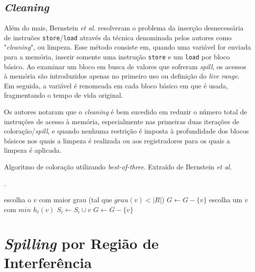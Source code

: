 \documentclass[
	12pt,				%
	openright,			%
	oneside,			%
	a4paper,			%
	tccpreliminar,			%
	]{ABNT-DC-UEL}
\begin{document}
\subsection{\textit{Cleaning}}

Além do mais, Bernstein \textit{et al.} resolveram o problema da inserção desnecessária de instruões \texttt{store}/\texttt{load} através da técnica denominada pelos autores como "\textit{cleaning}", ou limpeza. Esse método consiste em, quando uma variável for enviada para a memória, inserir somente uma instrução \texttt{store} e um \texttt{load} por bloco básico. Ao examinar um bloco em busca de valores que sofreram \textit{spill}, os acessos à memória são introduzidos apenas no primeiro uso ou definição do \textit{live range}. Em seguida, a variável é renomeada em cada bloco básico em que é usada, fragmentando o tempo de vida original.

Os autores notaram que o \textit{cleaning} é bem sucedido em reduzir o número total de instruções de acesso à memória, especialmente nas primeiras duas iterações de coloração/\textit{spill}, e quando nenhuma restrição é imposta à profundidade dos blocos básicos nos quais a limpeza é realizada ou aos registradores para os quais a limpeza é aplicada.

\begin{algorithm}
    \caption{Algoritmo de coloração utilizando \textit{best-of-three}. Extraído de Bernstein \textit{et al.} \cite{bernstein:89}}.
    \begin{algorithmic}
                        \State escolha o $v$ com maior grau (tal que $\textit{grau}(v) < |R|$)
                        \State $G \gets G - \{v\}$
                    \Else
                        \State escolha um $v$ com $\textit{min }h_i(v)$
                        \State $S_i \gets S_i \cup {v}$
                        \State $G \gets G - \{v\}$
                    \EndIf
                \EndWhile
            \EndFor
        \EndProcedure
    \end{algorithmic}
\end{algorithm}

\section{\textit{Spilling} por Região de Interferência}
\end{document}
